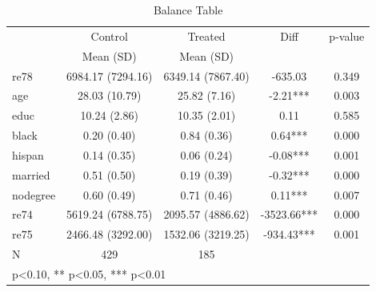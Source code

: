 \begin{table}[htbp]
\centering
\caption{Balance Table}
\begin{tabular}{lcccc}
\hline\hline
 & Control & Treated & Diff & p-value \\
 & Mean (SD) & Mean (SD) & & \\
\hline
re78 & 6984.17 (7294.16) & 6349.14 (7867.40) & -635.03 & 0.349 \\
age & 28.03 (10.79) & 25.82 (7.16) & -2.21*** & 0.003 \\
educ & 10.24 (2.86) & 10.35 (2.01) & 0.11 & 0.585 \\
black & 0.20 (0.40) & 0.84 (0.36) & 0.64*** & 0.000 \\
hispan & 0.14 (0.35) & 0.06 (0.24) & -0.08*** & 0.001 \\
married & 0.51 (0.50) & 0.19 (0.39) & -0.32*** & 0.000 \\
nodegree & 0.60 (0.49) & 0.71 (0.46) & 0.11*** & 0.007 \\
re74 & 5619.24 (6788.75) & 2095.57 (4886.62) & -3523.66*** & 0.000 \\
re75 & 2466.48 (3292.00) & 1532.06 (3219.25) & -934.43*** & 0.001 \\
\hline
N & 429 & 185 & & \\
\hline\hline
\multicolumn{5}{l}{\footnotesize * p<0.10, ** p<0.05, *** p<0.01} \\
\end{tabular}
\end{table}